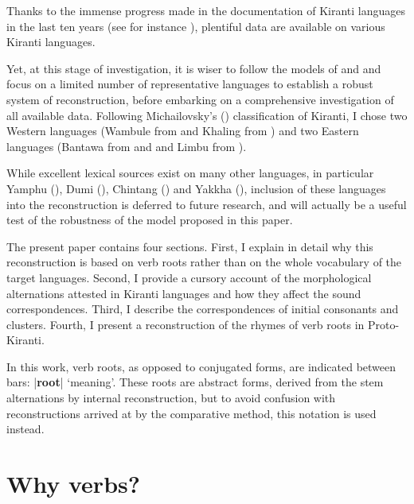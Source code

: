 \documentclass[oneside,a4paper,11pt]{article}
\newcommand{\ipa}[1]{\textbf{{\phon\mbox{#1}}}} %
\newcommand{\dhatu}[2]{|\ipa{#1}| `#2'}
\begin{document}
Thanks to the immense progress made in the documentation of Kiranti languages in the last ten years (see for instance \citealt{bickel07chintang, bickel07puma, schackow08puma, doornenbal09, lahaussois09, huysmans2011sampang, schackow15yakkha}), plentiful data are available on various Kiranti languages. 

Yet, at this stage of investigation, it is wiser to follow the models of \citet{bloomfield25central} and \citet{dempwolff34induktiver} and focus on a limited number of representative languages to establish a robust system of reconstruction, before embarking on a comprehensive investigation of all available data. Following Michailovsky's (\citeyear{michailovsky94stops}) classification of Kiranti, I chose two Western languages (Wambule  from \citealt{opgenort04wambule} and Khaling from \citealt{jacques12khaling, jacques15khaling}) and two Eastern languages (Bantawa from \citealt{doornenbal09} and \citealt{winter03bantawa} and Limbu from \citealt{driem87, michailovsky02dico}). 

 

While excellent lexical sources exist on many other languages, in particular  Yamphu (\citealt{rutgers98yamphu}), Dumi  (\citealt{driem93dumi, rai11dumi}), Chintang  (\citealt{rai11chintang}) and  Yakkha  (\citealt{kongren07yakkha}), inclusion of these languages into the reconstruction is deferred to future research, and will actually be a useful test of the robustness of the model proposed in this paper.

The present paper contains four sections. First, I explain in detail why this reconstruction is based on verb roots rather than on the whole vocabulary of the target languages. Second, I provide a cursory account of the morphological alternations attested in Kiranti languages and how they affect the sound correspondences. Third, I describe the correspondences of initial consonants and clusters. Fourth, I present a reconstruction of the rhymes of verb roots in Proto-Kiranti.

In this work, verb roots, as opposed to conjugated forms, are indicated between bars: \dhatu{root}{meaning}. These roots are abstract forms, derived from the stem alternations by internal reconstruction, but to avoid confusion with reconstructions arrived at by the comparative method, this notation is used instead. 

\section{Why verbs?} \label{sec:why}
\end{document}
